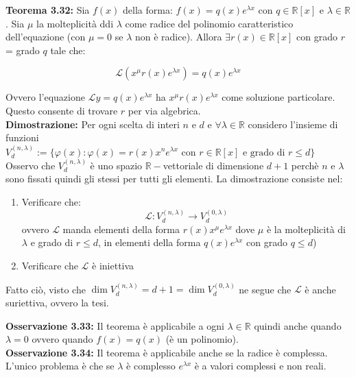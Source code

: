 \documentclass[a4paper,11pt,titlepage]{book}
\begin{document}
\textbf{Teorema 3.32:} Sia $f(x)$ della forma: $f(x)=q(x)e^{\lambda x}$ con $q\in\mathbb{R}[x]$ e $\lambda\in\mathbb{R}$. Sia $\mu$ la molteplicità ddi $\lambda$ come radice del polinomio caratteristico dell'equazione (con $\mu=0$ se $\lambda$ non è radice). Allora $\exists r(x)\in\mathbb{R}[x]$ con grado $r$= grado $q$ tale che:

$$\mathcal{L}(x^\mu r(x) e^{\lambda x})=q(x)e^{\lambda x}$$

Ovvero l'equazione $\mathcal{L}y=q(x)e^{\lambda x}$ ha $x^\mu r(x) e^{\lambda x}$ come soluzione particolare. Questo consente di trovare $r$ per via algebrica.\\

\textbf{Dimostrazione: }Per ogni scelta di interi $n$ e $d$ e $\forall \lambda\in\mathbb{R}$ considero l'insieme di funzioni $V_d^{(n,\lambda)}:=\{\varphi(x):\varphi(x)=r(x)x^ne^{\lambda x}\mbox{ con }r\in\mathbb{R}[x]\mbox{ e grado di }r\leq d\}$\\

Osservo che $V_d^{(n,\lambda)}$ è uno spazio $\mathbb{R}-$vettoriale di dimensione $d+1$ perchè $n$ e $\lambda$ sono fissati quindi gli stessi per tutti gli elementi. La dimostrazione consiste nel:\begin{enumerate}

\item Verificare che:
$$\mathcal{L}:V_d^{(n,\lambda)}\to V_d^{(0,\lambda)}$$
ovvero $\mathcal{L}$ manda elementi della forma $r(x)x^\mu e^{\lambda x}$ dove $\mu$ è la molteplicità di $\lambda$ e grado di $r\leq d$, in elementi della forma  $q(x)e^{\lambda x}$ con grado $q\leq d$)\\

\item Verificare che $\mathcal{L}$ è iniettiva

\end{enumerate}

Fatto ciò, visto che $\dim V_d^{(n,\lambda)}=d+1=\dim V_d^{(0,\lambda)}$  ne segue che $\mathcal{L}$ è anche suriettiva, ovvero la tesi.

\textbf{Osservazione 3.33:} Il teorema è applicabile a ogni $\lambda\in\mathbb{R}$ quindi anche quando $\lambda=0$ ovvero quando $f(x)=q(x)$ (è un polinomio).\\

\textbf{Osservazione 3.34:} Il teorema è applicabile anche se la radice è complessa. L'unico problema è che se $\lambda$ è complesso $e^{\lambda x}$ è a valori complessi e non reali.\\
\end{document}
